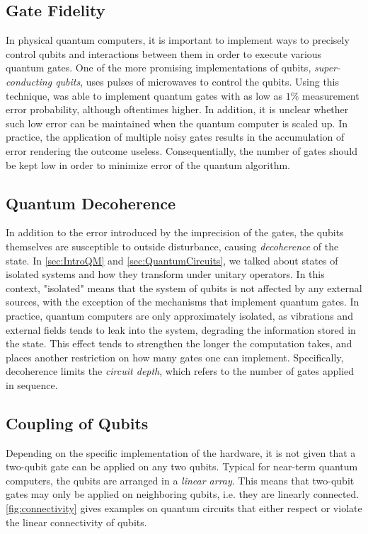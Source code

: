 \subsection{Gate Fidelity}\label{sec:GateFidelity}
In physical quantum computers, it is important to implement ways to precisely control qubits and interactions between them in order to execute various quantum gates. One of the more promising implementations of qubits, \emph{super-conducting qubits}, uses pulses of microwaves to control the qubits. Using this technique, \citet{Barends_2014} was able to implement quantum gates with as low as $1\%$ measurement error probability, although oftentimes higher. In addition, it is unclear whether such low error can be maintained when the quantum computer is scaled up. In practice, the application of multiple noisy gates results in the accumulation of error rendering the outcome useless\cite{Preskill_2018}. Consequentially, the number of gates should be kept low in order to minimize error of the quantum algorithm. 

\subsection{Quantum Decoherence}\label{sec:DaEC}
In addition to the error introduced by the imprecision of the gates, the qubits themselves are susceptible to outside disturbance, causing \emph{decoherence} of the state. In \cref{sec:IntroQM} and \cref{sec:QuantumCircuits}, we talked about states of isolated systems and how they transform under unitary operators. In this context, "isolated" means that the system of qubits is not affected by any external sources, with the exception of the mechanisms that implement quantum gates. In practice, quantum computers are only approximately isolated, as vibrations and external fields tends to leak into the system, degrading the information stored in the state. This effect tends to strengthen the longer the computation takes, and places another restriction on how many gates one can implement. Specifically, decoherence limits the \emph{circuit depth}, which refers to the number of gates applied in sequence. 

\subsection{Coupling of Qubits}\label{sec:CoQ}
Depending on the specific implementation of the hardware, it is not given that a two-qubit gate can be applied on any two qubits. Typical for near-term quantum computers, the qubits are arranged in a \emph{linear array}\cite{Holmes_2020}. This means that two-qubit gates may only be applied on neighboring qubits, i.e. they are linearly connected. \cref{fig:connectivity} gives examples on quantum circuits that either respect or violate the linear connectivity of qubits.     

